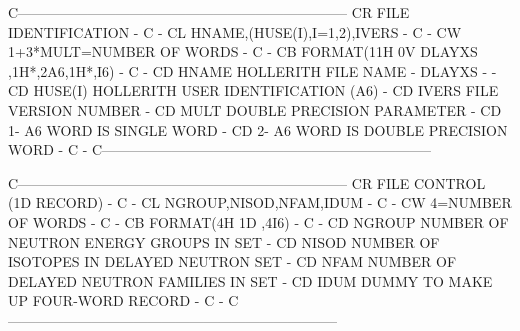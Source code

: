 \begin{ccode}
C-----------------------------------------------------------------------
CR          FILE IDENTIFICATION                                        -
C                                                                      -
CL    HNAME,(HUSE(I),I=1,2),IVERS                                      -
C                                                                      -
CW    1+3*MULT=NUMBER OF WORDS                                         -
C                                                                      -
CB    FORMAT(11H 0V DLAYXS  ,1H*,2A6,1H*,I6)                           -
C                                                                      -
CD    HNAME       HOLLERITH FILE NAME - DLAYXS -                       -
CD    HUSE(I)     HOLLERITH USER IDENTIFICATION (A6)                   -
CD    IVERS       FILE VERSION NUMBER                                  -
CD    MULT        DOUBLE PRECISION PARAMETER                           -
CD                    1- A6 WORD IS SINGLE WORD                        -
CD                    2- A6 WORD IS DOUBLE PRECISION WORD              -
C                                                                      -
C-----------------------------------------------------------------------

C-----------------------------------------------------------------------
CR          FILE CONTROL   (1D RECORD)                                 -
C                                                                      -
CL    NGROUP,NISOD,NFAM,IDUM                                           -
C                                                                      -
CW    4=NUMBER OF WORDS                                                -
C                                                                      -
CB    FORMAT(4H 1D ,4I6)                                               -
C                                                                      -
CD    NGROUP        NUMBER OF NEUTRON ENERGY GROUPS IN SET             -
CD    NISOD         NUMBER OF ISOTOPES IN DELAYED NEUTRON SET          -
CD    NFAM          NUMBER OF DELAYED NEUTRON FAMILIES IN SET          -
CD    IDUM          DUMMY TO MAKE UP FOUR-WORD RECORD                  -
C                                                                      -
C-----------------------------------------------------------------------


\end{ccode}
